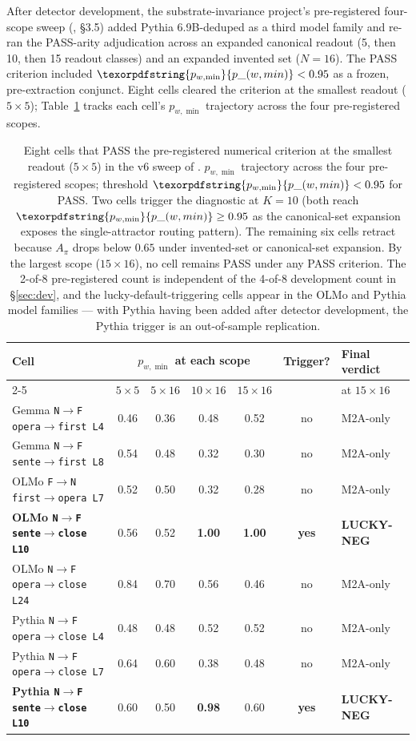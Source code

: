 \documentclass[11pt,letterpaper]{article}
\newcommand{\pwmin}{\texorpdfstring{\ensuremath{p_{w,\min}}}{p\_(w,min)}}
\newcommand{\NtoF}{N$\to$F}
\newcommand{\FtoN}{F$\to$N}
\begin{document}
After detector development, the substrate-invariance project's
pre-registered four-scope sweep
(\citealp{budworth2026substrate}, \S3.5) added Pythia 6.9B-deduped
as a third model family and re-ran the PASS-arity adjudication
across an expanded canonical readout (5, then 10, then 15 readout
classes) and an expanded invented set ($N = 16$). The PASS criterion
included $\pwmin < 0.95$ as a frozen, pre-extraction conjunct. Eight
cells cleared the criterion at the smallest readout
($5 \times 5$); Table~\ref{tab:8cells} tracks each cell's \pwmin{}
trajectory across the four pre-registered scopes.

\begin{table}[h]
  \centering
  \small
  \begin{tabular}{lcccccl}
    \toprule
    Cell & \multicolumn{4}{c}{\pwmin{} at each scope} & Trigger? & Final verdict\\
    \cmidrule(lr){2-5}
         & $5 \times 5$ & $5 \times 16$ & $10 \times 16$ & $15 \times 16$ & & at $15 \times 16$\\
    \midrule
    Gemma \texttt{\NtoF{} opera$\to$first L4}  & 0.46 & 0.36 & 0.48 & 0.52 & no  & M2A-only\\
    Gemma \texttt{\NtoF{} sente$\to$first L8}  & 0.54 & 0.48 & 0.32 & 0.30 & no  & M2A-only\\
    OLMo  \texttt{\FtoN{} first$\to$opera L7}  & 0.52 & 0.50 & 0.32 & 0.28 & no  & M2A-only\\
    \textbf{OLMo \texttt{\NtoF{} sente$\to$close L10}} & 0.56 & 0.52 & \textbf{1.00} & \textbf{1.00} & \textbf{yes} & \textbf{LUCKY-NEG}\\
    OLMo  \texttt{\NtoF{} opera$\to$close L24} & 0.84 & 0.70 & 0.56 & 0.46 & no  & M2A-only\\
    Pythia \texttt{\NtoF{} opera$\to$close L4} & 0.48 & 0.48 & 0.52 & 0.52 & no  & M2A-only\\
    Pythia \texttt{\NtoF{} opera$\to$close L7} & 0.64 & 0.60 & 0.38 & 0.48 & no  & M2A-only\\
    \textbf{Pythia \texttt{\NtoF{} sente$\to$close L10}} & 0.60 & 0.50 & \textbf{0.98} & 0.60 & \textbf{yes} & \textbf{LUCKY-NEG}\\
    \bottomrule
  \end{tabular}
  \caption{Eight cells that PASS the pre-registered numerical
  criterion at the smallest readout ($5 \times 5$) in the v6 sweep
  of \citet{budworth2026substrate}. \pwmin{} trajectory across the
  four pre-registered scopes; threshold $\pwmin < 0.95$ for PASS.
  Two cells trigger the diagnostic at $K = 10$ (both reach
  $\pwmin \geq 0.95$ as the canonical-set expansion exposes the
  single-attractor routing pattern). The remaining six cells
  retract because $A_\pi$ drops below $0.65$ under invented-set or
  canonical-set expansion. By the largest scope ($15 \times 16$),
  no cell remains PASS under any PASS criterion. The 2-of-8
  pre-registered count is independent of the 4-of-8 development
  count in \S\ref{sec:dev}, and the lucky-default-triggering cells
  appear in the OLMo and Pythia model families --- with Pythia
  having been added after detector development, the Pythia trigger
  is an out-of-sample replication.}
  \label{tab:8cells}
\end{table}
\end{document}
